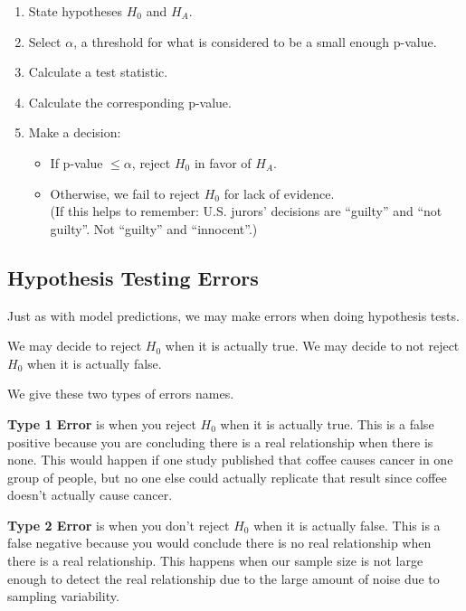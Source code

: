 \documentclass[
]{book}
\providecommand{\tightlist}{%
  \setlength{\itemsep}{0pt}\setlength{\parskip}{0pt}}
\begin{document}
\begin{enumerate}
\def\labelenumi{\arabic{enumi}.}
\tightlist
\item
  State hypotheses \(H_0\) and \(H_A\).
\item
  Select \(\alpha\), a threshold for what is considered to be a small enough p-value.
\item
  Calculate a test statistic.
\item
  Calculate the corresponding p-value.
\item
  Make a decision:

  \begin{itemize}
  \tightlist
  \item
    If p-value \(\leq\alpha\), reject \(H_0\) in favor of \(H_A\).
  \item
    Otherwise, we fail to reject \(H_0\) for lack of evidence.\\
    (If this helps to remember: U.S. jurors' decisions are ``guilty'' and ``not guilty''. Not ``guilty'' and ``innocent''.)
  \end{itemize}
\end{enumerate}

\hypertarget{hypothesis-testing-errors}{%
\subsection{Hypothesis Testing Errors}\label{hypothesis-testing-errors}}

Just as with model predictions, we may make errors when doing hypothesis tests.

We may decide to reject \(H_0\) when it is actually true. We may decide to not reject \(H_0\) when it is actually false.

We give these two types of errors names.

\textbf{Type 1 Error} is when you reject \(H_0\) when it is actually true. This is a false positive because you are concluding there is a real relationship when there is none. This would happen if one study published that coffee causes cancer in one group of people, but no one else could actually replicate that result since coffee doesn't actually cause cancer.

\textbf{Type 2 Error} is when you don't reject \(H_0\) when it is actually false. This is a false negative because you would conclude there is no real relationship when there is a real relationship. This happens when our sample size is not large enough to detect the real relationship due to the large amount of noise due to sampling variability.
\end{document}
